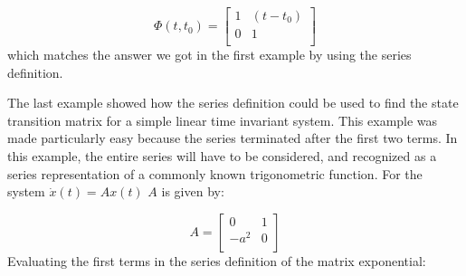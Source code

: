 \begin{example}
  \begin{equation*}
    \Phi(t,t_{0})=
    \left[
      \begin{array}{cc}
        1 & (t-t_{0}) \\
        0 & 1 \\
      \end{array}
    \right]
  \end{equation*}
  which matches the answer we got in the first example by using the series definition.
\end{example}

\begin{example}
  The last example showed how the series definition could be used to find the state transition matrix for a simple linear time invariant system.
  This example was made particularly easy because the series terminated after the first two terms.
  In this example, the entire series will have to be considered, and recognized as a series representation of a commonly known trigonometric function.
  For the system $\dot{x}(t)=Ax(t)$ $A$ is given by:

  \begin{equation*}
    A=
    \left[
      \begin{array}{cc}
        0 & 1 \\
        -a^{2} & 0 \\
      \end{array}
    \right]
  \end{equation*}
  Evaluating the first terms in the series definition of the matrix exponential:


\end{example}
